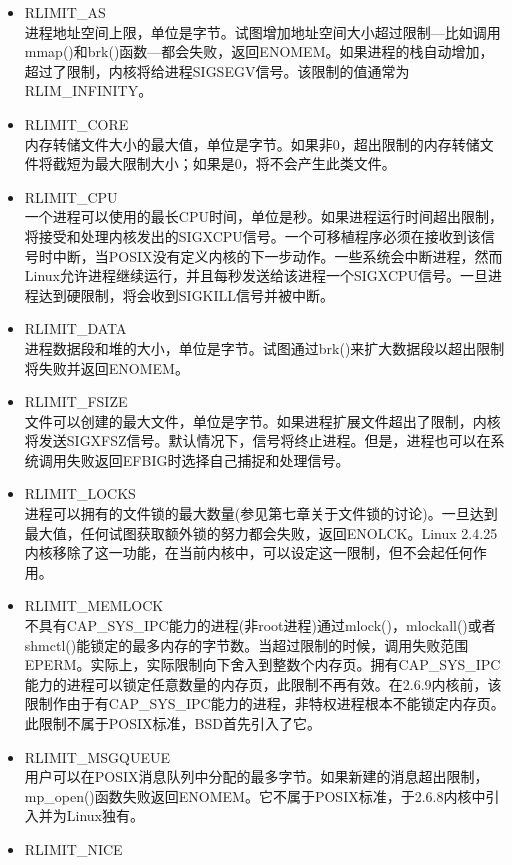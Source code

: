 \begin{itemize}{}
\item RLIMIT\_AS\\
  进程地址空间上限，单位是字节。试图增加地址空间大小超过限制---比如调用mmap()和brk()函数---都会失败，返回ENOMEM。如果进程的栈自动增加，超过了限制，内核将给进程SIGSEGV信号。该限制的值通常为RLIM\_INFINITY。
\item RLIMIT\_CORE\\
  内存转储文件大小的最大值，单位是字节。如果非0，超出限制的内存转储文件将截短为最大限制大小；如果是0，将不会产生此类文件。
\item RLIMIT\_CPU\\
  一个进程可以使用的最长CPU时间，单位是秒。如果进程运行时间超出限制，将接受和处理内核发出的SIGXCPU信号。一个可移植程序必须在接收到该信号时中断，当POSIX没有定义内核的下一步动作。一些系统会中断进程，然而Linux允许进程继续运行，并且每秒发送给该进程一个SIGXCPU信号。一旦进程达到硬限制，将会收到SIGKILL信号并被中断。
\item RLIMIT\_DATA\\
  进程数据段和堆的大小，单位是字节。试图通过brk()来扩大数据段以超出限制将失败并返回ENOMEM。
\item RLIMIT\_FSIZE\\
  文件可以创建的最大文件，单位是字节。如果进程扩展文件超出了限制，内核将发送SIGXFSZ信号。默认情况下，信号将终止进程。但是，进程也可以在系统调用失败返回EFBIG时选择自己捕捉和处理信号。
\item RLIMIT\_LOCKS\\
  进程可以拥有的文件锁的最大数量(参见第七章关于文件锁的讨论)。一旦达到最大值，任何试图获取额外锁的努力都会失败，返回ENOLCK。Linux 2.4.25内核移除了这一功能，在当前内核中，可以设定这一限制，但不会起任何作用。
\item RLIMIT\_MEMLOCK\\
  不具有CAP\_SYS\_IPC能力的进程(非root进程)通过mlock()，mlockall()或者shmctl()能锁定的最多内存的字节数。当超过限制的时候，调用失败范围EPERM。实际上，实际限制向下舍入到整数个内存页。拥有CAP\_SYS\_IPC能力的进程可以锁定任意数量的内存页，此限制不再有效。在2.6.9内核前，该限制作由于有CAP\_SYS\_IPC能力的进程，非特权进程根本不能锁定内存页。此限制不属于POSIX标准，BSD首先引入了它。
\item RLIMIT\_MSGQUEUE\\
  用户可以在POSIX消息队列中分配的最多字节。如果新建的消息超出限制，mp\_open()函数失败返回ENOMEM。它不属于POSIX标准，于2.6.8内核中引入并为Linux独有。
\item RLIMIT\_NICE\\

\end{itemize}

